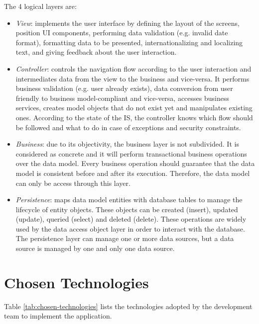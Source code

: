 \documentclass[envcountsame,envcountchap]{svmono}
\begin{document}
The 4 logical layers are:

\begin{itemize}
\item \textit{View}: implements the user interface by defining the layout of the screens, position UI components, performing data validation (e.g. invalid date format), formatting data to be presented, internationalizing and localizing text, and giving feedback about the user interaction.

\item \textit{Controller}: controls the navigation flow according to the user interaction and intermediates data from the view to the business and vice-versa. It performs business validation (e.g. user already exists), data conversion from user friendly to business model-compliant and vice-versa, accesses business services, creates model objects that do not exist yet and manipulates existing ones. According to the state of the IS, the controller knows which flow should be followed and what to do in case of exceptions and security constraints.

\item \textit{Business}: due to its objectivity, the business layer is not subdivided. It is considered as concrete and it will perform transactional business operations over the data model. Every business operation should guarantee that the data model is consistent before and after its execution. Therefore, the data model can only be access through this layer.

\item \textit{Persistence}: maps data model entities with database tables to manage the lifecycle of entity objects. These objects can be created (insert), updated (update), queried (select) and deleted (delete). These operations are widely used by the data access object layer in order to interact with the database. The persistence layer can manage one or more data sources, but a data source is managed by one and only one data source.
\end{itemize}

\section{Chosen Technologies}

Table \ref{tab:chosen-technologies} lists the technologies adopted by the development team to implement the application.
\end{document}
